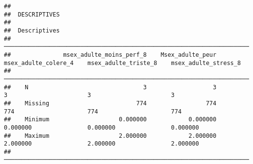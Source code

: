\documentclass[
]{article}
\begin{document}
\begin{verbatim}
## 
##  DESCRIPTIVES
## 
##  Descriptives                                                                                                                        
##  ─────────────────────────────────────────────────────────────────────────────────────────────────────────────────────────────────── 
##               msex_adulte_moins_perf_8    Msex_adulte_peur    msex_adulte_colere_4    msex_adulte_triste_8    msex_adulte_stress_8   
##  ─────────────────────────────────────────────────────────────────────────────────────────────────────────────────────────────────── 
##    N                                 3                   3                       3                       3                       3   
##    Missing                         774                 774                     774                     774                     774   
##    Minimum                    0.000000            0.000000                0.000000                0.000000                0.000000   
##    Maximum                    2.000000            2.000000                2.000000                2.000000                2.000000   
##  ───────────────────────────────────────────────────────────────────────────────────────────────────────────────────────────────────
\end{verbatim}
\end{document}
